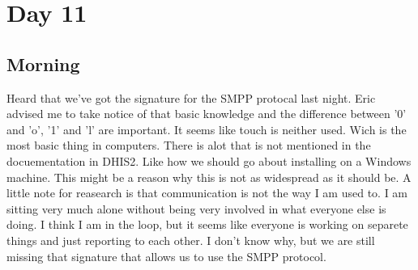 \section{Day 11}
\subsection{Morning}
Heard that we've got the signature for the SMPP protocal last night.
Eric advised me to take notice of that basic knowledge and the difference between '0' and 'o', '1' and 'l' are important. It seems like touch is neither used. Wich is the most basic thing in computers.
There is alot that is not mentioned in the docuementation in DHIS2. Like how we should go about installing on a Windows machine. This might be a reason why this is not as widespread as it should be.
A little note for reasearch is that communication is not the way I am used to.
I am sitting very much alone without being very involved in what everyone else is doing.
I think I am in the loop, but it seems like everyone is working on separete things and just reporting to each other. 
I don't know why, but we are still missing that signature that allows us to use the SMPP protocol.